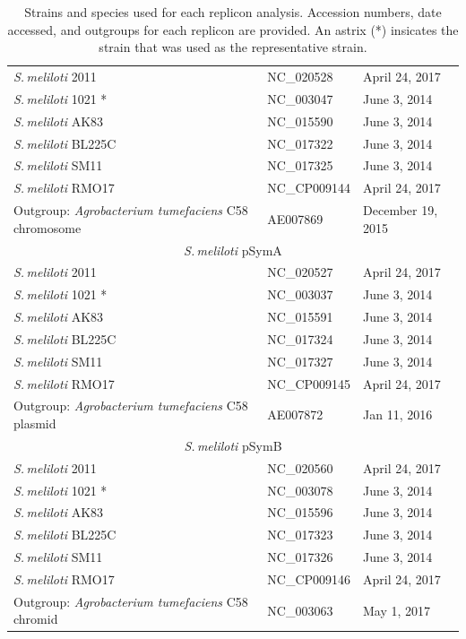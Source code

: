 \documentclass[11pt]{article}
\newcommand{\smel}{\textit{S.\,meliloti}\xspace}
\newcommand{\agrot}{\textit{Agrobacterium tumefaciens}\xspace}
\begin{document}
\begin{table}[H]
{\begin{minipage}{\textwidth}
\begin{tabular}{lll}
				\midrule
				\smel 2011 & NC\_020528 & April 24, 2017\\
				\smel 1021 * & NC\_003047 & June 3, 2014\\
				\smel AK83 & NC\_015590 & June 3, 2014\\
				\smel BL225C & NC\_017322 & June 3, 2014\\
				\smel SM11 & NC\_017325 & June 3, 2014\\
				\smel RMO17 & NC\_CP009144 & April 24, 2017\\
				Outgroup: \agrot C58 chromosome & AE007869 & December 19, 2015\\
				\midrule
				\multicolumn{3}{c}{\smel pSymA} \\
				\midrule
				\smel 2011 & NC\_020527& April 24, 2017\\
				\smel 1021 * & NC\_003037 & June 3, 2014\\
				\smel AK83 & NC\_015591 & June 3, 2014\\
				\smel BL225C & NC\_017324 & June 3, 2014\\
				\smel SM11 & NC\_017327 & June 3, 2014\\
				\smel RMO17 & NC\_CP009145& April 24, 2017\\
				Outgroup: \agrot C58 plasmid & AE007872 & Jan 11, 2016\\
				\midrule
				\multicolumn{3}{c}{\smel pSymB} \\
				\midrule
				\smel 2011 & NC\_020560 & April 24, 2017\\
				\smel 1021 * & NC\_003078 & June 3, 2014\\
				\smel AK83 & NC\_015596 & June 3, 2014\\
				\smel BL225C & NC\_017323 & June 3, 2014\\
				\smel SM11 & NC\_017326 & June 3, 2014\\
				\smel RMO17 & NC\_CP009146 & April 24, 2017\\
				Outgroup: \agrot C58 chromid & NC\_003063 & May 1, 2017\\
				\bottomrule
				
				
			\end{tabular}
			\caption{\label{tab:seqdata} Strains and species used for each replicon analysis. Accession numbers, date accessed, and outgroups for each replicon are provided. An astrix (*) insicates the strain that was used as the representative strain.}
		\end{minipage}}
	\end{table}	
\end{document}

